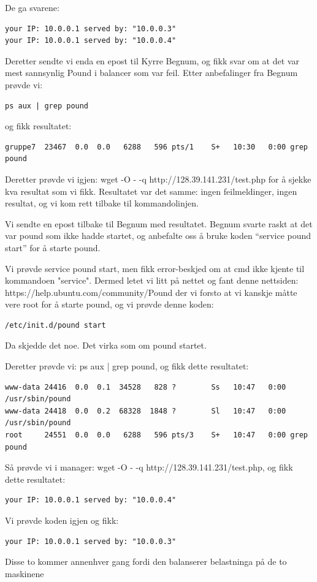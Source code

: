 \documentclass[a4paper, norsk, 12pt]{article}
\begin{document}
De ga svarene:
\begin{verbatim}
your IP: 10.0.0.1 served by: "10.0.0.3"
your IP: 10.0.0.1 served by: "10.0.0.4"
\end{verbatim}

Deretter sendte vi enda en epost til Kyrre Begnum, og fikk svar om at det var mest sannsynlig Pound i balancer som var feil. Etter anbefalinger fra Begnum prøvde vi:
\begin{verbatim}
ps aux | grep pound 
\end{verbatim}
og fikk resultatet:
\begin{verbatim}
gruppe7  23467  0.0  0.0   6288   596 pts/1    S+   10:30   0:00 grep pound
\end{verbatim}

Deretter prøvde vi igjen: wget -O - -q http://128.39.141.231/test.php for å sjekke kva resultat som vi fikk. Resultatet var det samme: ingen feilmeldinger, ingen resultat, og vi kom rett tilbake til kommandolinjen.

Vi sendte en epost tilbake til Begnum med resultatet. Begnum svarte raskt at det var pound som ikke hadde startet, og anbefalte oss å bruke koden “service pound start” for å starte pound.

Vi prøvde service pound start, men fikk error-beskjed om at cmd ikke kjente til kommandoen "service". Dermed letet vi litt på nettet og fant denne nettsiden:   https://help.ubuntu.com/community/Pound
der vi forsto at vi kanskje måtte vere root for å starte pound, og vi prøvde denne koden:
\begin{verbatim}
/etc/init.d/pound start
\end{verbatim}
Da skjedde det noe. Det virka som om pound startet.

Deretter prøvde vi: ps aux | grep pound, og fikk dette resultatet:
\begin{verbatim}
www-data 24416  0.0  0.1  34528   828 ?        Ss   10:47   0:00 /usr/sbin/pound
www-data 24418  0.0  0.2  68328  1848 ?        Sl   10:47   0:00 /usr/sbin/pound
root     24551  0.0  0.0   6288   596 pts/3    S+   10:47   0:00 grep pound
\end{verbatim}
Så prøvde vi i manager: wget -O - -q http://128.39.141.231/test.php, og fikk dette resultatet:
\begin{verbatim}
your IP: 10.0.0.1 served by: "10.0.0.4"
\end{verbatim}
Vi prøvde koden igjen og fikk: 
\begin{verbatim}
your IP: 10.0.0.1 served by: "10.0.0.3"
\end{verbatim} 
Disse to kommer annenhver gang fordi den balanserer belastninga på de to maskinene
\end{document}
